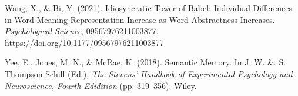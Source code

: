 \documentclass[11pt,man]{article}
\newenvironment{CSLReferences}%
  {}%
  {\par}
\begin{document}
\begin{CSLReferences}{1}{0}
\leavevmode{}%
Wang, X., \& Bi, Y. (2021). Idiosyncratic {Tower} of {Babel}:
{Individual Differences} in {Word-Meaning Representation Increase} as
{Word Abstractness Increases}. \emph{Psychological Science},
09567976211003877. \url{https://doi.org/10.1177/09567976211003877}

\leavevmode{}%
Yee, E., Jones, M. N., \& McRae, K. (2018). Semantic {Memory}. In J. W.
\&. S. Thompson-Schill (Ed.), \emph{The {Stevens}' {Handbook} of
{Experimental Psychology} and {Neuroscience}, {Fourth Edidition}} (pp.
319--356). {Wiley}.

\end{CSLReferences}
\end{document}
